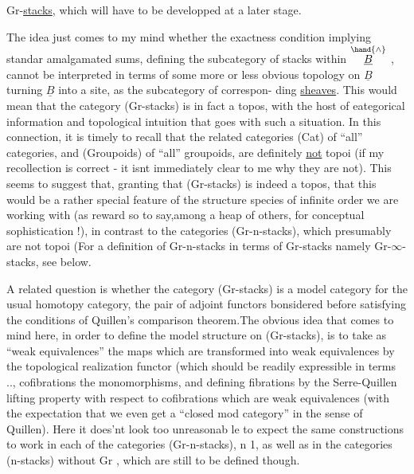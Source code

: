 Gr-\uline{stacks}, which will have to  be developped at a later stage.

The idea just comes to my mind whether the exactness condition
implying standar amalgamated sums, defining the subcategory of stacks
within $\overset{\hand{\wedge}}{\underline{B}}$ , cannot be interpreted in terms of some more or less obvious
topology on $\underline{B}$ turning $\underline{B}$ into a site, as the subcategory of correspon-%
ding \uline{sheaves}. This would mean that the category (Gr-stacks) is in fact
a topos, with the host of eategorical information and topological
intuition that goes with such a situation. In this connection, it is
timely to recall that the related categories (Cat) of ``all'' categories,
and (Groupoids) of ``all'' groupoids, are definitely \uline{not} topoi (if my
recollection is correct - it isnt immediately clear to me why they
are not). This seems to suggest that, granting that (Gr-stacks) is
indeed a topos, that this would be a rather special feature of the
structure species of infinite order we are working with (as  reward so
to say,among a heap of others, for conceptual sophistication !), in
contrast to the categories (Gr-n-stacks), which presumably are not topoi
(For a definition of Gr-n-stacks in terms of Gr-stacks namely
Gr-$\infty$-stacks, see below.\hand{)}

A related question is whether the category (Gr-stacks) is a model
category for the usual homotopy category, the pair of adjoint functors
bonsidered before satisfying  the conditions of Quillen's comparison
theorem.The obvious idea that comes to mind here, in order to define
the model structure on (Gr-stacks), is to take as ``weak equivalences''
the maps which are transformed into weak equivalences by the topological
realization functor (which should be readily expressible in  terms  ..\hand{)},
 cofibrations the monomorphisms, and defining fibrations by the
Serre-Quillen lifting property with respect to cofibrations which are
weak equivalences (with the expectation that we even get a ``closed mod
category'' in the sense of Quillen). Here it does'nt look too unreasonab
\hand{-}le to expect the same constructions to work in each of the categories
(Gr-n-stacks), n \over{$>$}{$\geqslant$}1, as well as in the categories (n-stacks) without
Gr , which are still to be defined though.

